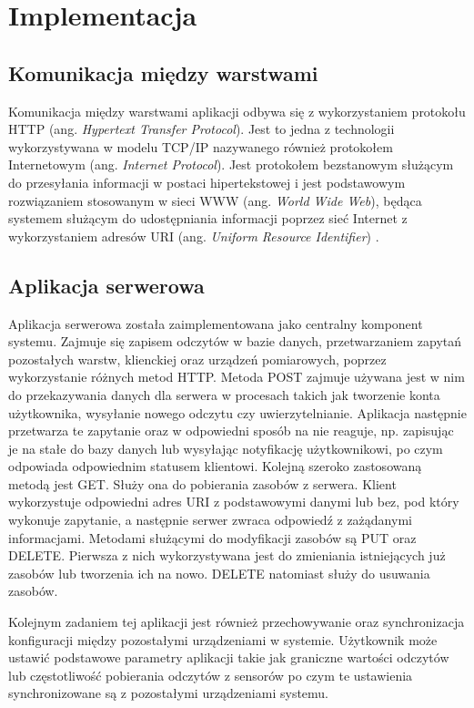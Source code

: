 \chapter{Implementacja}

\section{Komunikacja między warstwami}
Komunikacja między warstwami aplikacji odbywa się z wykorzystaniem protokołu 
HTTP (ang. \textit{Hypertext Transfer Protocol}).
Jest to jedna z technologii wykorzystywana w modelu TCP/IP 
nazywanego również protokołem Internetowym (ang. \textit{Internet Protocol}).
Jest protokołem bezstanowym \cite{http:rfc9110} służącym do przesyłania
informacji w postaci hipertekstowej i jest podstawowym rozwiązaniem
stosowanym w sieci WWW (ang. \textit{World Wide Web}), będąca systemem 
służącym do udostępniania informacji poprzez sieć Internet
z wykorzystaniem adresów URI (ang. \textit{Uniform Resource Identifier}) \cite{Jacobs:04:AWW}.


\section{Aplikacja serwerowa}
Aplikacja serwerowa została zaimplementowana jako centralny komponent systemu.
Zajmuje się zapisem odczytów w bazie danych, przetwarzaniem zapytań
pozostałych warstw, klienckiej oraz urządzeń pomiarowych,
poprzez wykorzystanie różnych metod HTTP.
Metoda POST zajmuje używana jest w nim do przekazywania danych
dla serwera w procesach takich jak tworzenie konta użytkownika,
wysyłanie nowego odczytu czy uwierzytelnianie.
Aplikacja następnie przetwarza te zapytanie oraz w odpowiedni 
sposób na nie reaguje, np. zapisując je na stałe do bazy danych 
lub wysyłając notyfikację użytkownikowi, po czym odpowiada
odpowiednim statusem klientowi.
Kolejną szeroko zastosowaną metodą jest GET. Służy ona do pobierania
zasobów z serwera. Klient wykorzystuje odpowiedni adres URI z
podstawowymi danymi lub bez, pod który wykonuje zapytanie, a
następnie serwer zwraca odpowiedź z zażądanymi informacjami.
Metodami służącymi do modyfikacji zasobów są PUT oraz DELETE.
Pierwsza z nich wykorzystywana jest do zmieniania istniejących
już zasobów lub tworzenia ich na nowo. DELETE natomiast służy
do usuwania zasobów.

Kolejnym zadaniem tej aplikacji jest również przechowywanie oraz synchronizacja konfiguracji
między pozostałymi urządzeniami w systemie. Użytkownik może ustawić podstawowe
parametry aplikacji takie jak graniczne wartości odczytów lub
częstotliwość pobierania odczytów z sensorów po czym te ustawienia
synchronizowane są z pozostałymi urządzeniami systemu.

